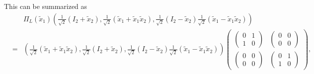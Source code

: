 \documentclass[aps,preprint]{revtex4}
\begin{document}
This can be summarized as 
\begin{eqnarray}
&&\Pi _{L}\left( \widetilde{x}_{1}\right) \left( \frac{1}{\sqrt{2}}\left(
I_{2}+\widetilde{x}_{2}\right) ,\frac{1}{\sqrt{2}}\left( \widetilde{x}_{1}+%
\widetilde{x}_{1}\widetilde{x}_{2}\right) ,\frac{1}{\sqrt{2}}\left( I_{2}-%
\widetilde{x}_{2}\right) \frac{1}{\sqrt{2}}\left( \widetilde{x}_{1}-%
\widetilde{x}_{1}\widetilde{x}_{2}\right) \right) \\
&=&\left( \frac{1}{\sqrt{2}}\left( \widetilde{x}_{1}+\widetilde{x}_{1}%
\widetilde{x}_{2}\right) ,\frac{1}{\sqrt{2}}\left( I_{2}+\widetilde{x}%
_{2}\right) ,\frac{1}{\sqrt{2}}\left( I_{2}-\widetilde{x}_{2}\right) \frac{1%
}{\sqrt{2}}\left( \widetilde{x}_{1}-\widetilde{x}_{1}\widetilde{x}%
_{2}\right) \right) \left( 
\begin{array}{cc}
\left( 
\begin{array}{cc}
0 & 1 \\ 
1 & 0%
\end{array}%
\right) & \left( 
\begin{array}{cc}
0 & 0 \\ 
0 & 0%
\end{array}%
\right) \\ 
\left( 
\begin{array}{cc}
0 & 0 \\ 
0 & 0%
\end{array}%
\right) & \left( 
\begin{array}{cc}
0 & 1 \\ 
1 & 0%
\end{array}%
\right)%
\end{array}%
\right) ,
\end{eqnarray}%
\end{document}
